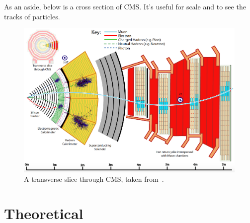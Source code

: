 As an aside, below is a cross section of CMS. It's useful for scale and to see the tracks of particles.

\begin{figure}[H]
\centering
\includegraphics[width=\textwidth]{./sec14/Transverse_slice_CMS.png}
\caption{A transverse slice through CMS, taken from~\cite{CMS-PRF-14-001}.}
\end{figure}


\section{Theoretical}

